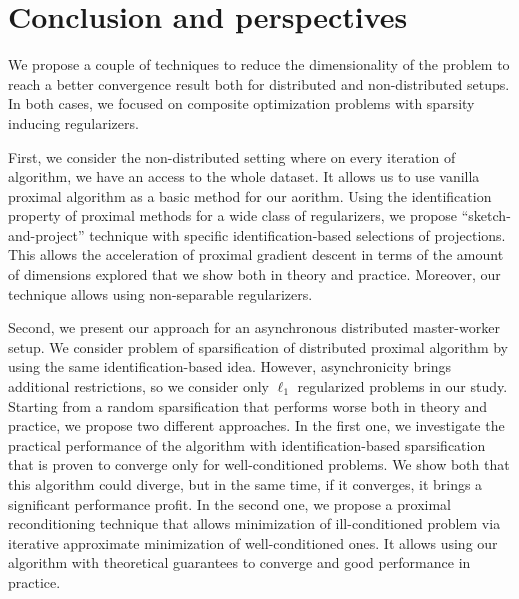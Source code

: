 \chapter*{Conclusion and perspectives}
\label{ch:conclusion}

We propose a couple of techniques to reduce the dimensionality of the problem to reach a better convergence result both for distributed and non-distributed setups. In both cases, we focused on composite optimization problems with sparsity inducing regularizers.%

First, we consider the non-distributed setting where on every iteration of algorithm, we have an access to the whole dataset. It allows us to use vanilla proximal algorithm as a basic method for our aorithm. Using the identification property of proximal methods for a wide class of regularizers, we propose  ``sketch-and-project'' technique with specific identification-based selections of projections. This allows the acceleration of proximal gradient descent in terms of the amount of dimensions explored that we show both in theory and practice. Moreover, our technique allows using non-separable regularizers.

Second, we present our approach for an asynchronous distributed master-worker setup. We consider  problem of sparsification of distributed proximal algorithm by using the same identification-based idea. However, asynchronicity brings additional restrictions, so we consider only $\ell_1$ regularized problems in our study. Starting from a random sparsification that performs worse both in theory and practice, we propose two different approaches. In the first one, we investigate the practical performance of the algorithm with identification-based sparsification that is proven to converge only for well-conditioned problems. We show both that this algorithm could diverge, but in the same time, if it converges, it brings a significant performance profit. In the second one, we propose a proximal reconditioning technique that allows minimization of ill-conditioned problem via iterative approximate minimization of well-conditioned ones. It allows using our algorithm with theoretical guarantees to converge and good performance in practice.

